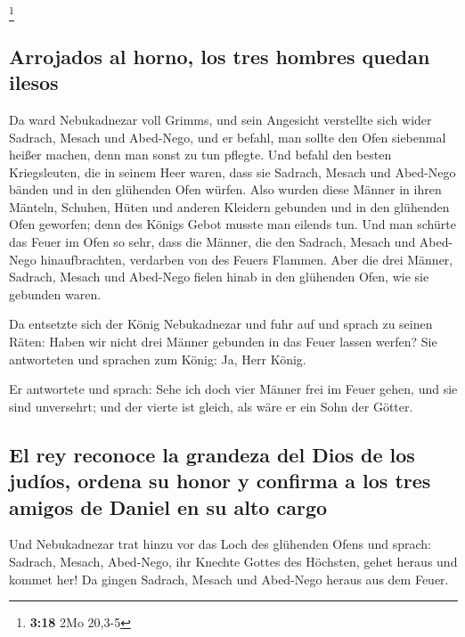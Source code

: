 \footnote{\textbf{3:18} 2Mo 20,3-5}

\hypertarget{arrojados-al-horno-los-tres-hombres-quedan-ilesos}{%
\subsection{Arrojados al horno, los tres hombres quedan
ilesos}\label{arrojados-al-horno-los-tres-hombres-quedan-ilesos}}

 Da ward Nebukadnezar voll Grimms, und sein Angesicht
verstellte sich wider Sadrach, Mesach und Abed-Nego, und er befahl, man
sollte den Ofen siebenmal heißer machen, denn man sonst zu tun pflegte.
 Und befahl den besten Kriegsleuten, die in seinem Heer
waren, dass sie Sadrach, Mesach und Abed-Nego bänden und in den
glühenden Ofen würfen.  Also wurden diese Männer in ihren
Mänteln, Schuhen, Hüten und anderen Kleidern gebunden und in den
glühenden Ofen geworfen;  denn des Königs Gebot musste
man eilends tun. Und man schürte das Feuer im Ofen so sehr, dass die
Männer, die den Sadrach, Mesach und Abed-Nego hinaufbrachten, verdarben
von des Feuers Flammen.  Aber die drei Männer, Sadrach,
Mesach und Abed-Nego fielen hinab in den glühenden Ofen, wie sie
gebunden waren.

 Da entsetzte sich der König Nebukadnezar und fuhr auf
und sprach zu seinen Räten: Haben wir nicht drei Männer gebunden in das
Feuer lassen werfen? Sie antworteten und sprachen zum König: Ja, Herr
König.

 Er antwortete und sprach: Sehe ich doch vier Männer frei
im Feuer gehen, und sie sind unversehrt; und der vierte ist gleich, als
wäre er ein Sohn der Götter.

\hypertarget{el-rey-reconoce-la-grandeza-del-dios-de-los-juduxedos-ordena-su-honor-y-confirma-a-los-tres-amigos-de-daniel-en-su-alto-cargo}{%
\subsection{El rey reconoce la grandeza del Dios de los judíos, ordena
su honor y confirma a los tres amigos de Daniel en su alto
cargo}\label{el-rey-reconoce-la-grandeza-del-dios-de-los-juduxedos-ordena-su-honor-y-confirma-a-los-tres-amigos-de-daniel-en-su-alto-cargo}}

 Und Nebukadnezar trat hinzu vor das Loch des glühenden
Ofens und sprach: Sadrach, Mesach, Abed-Nego, ihr Knechte Gottes des
Höchsten, gehet heraus und kommet her! Da gingen Sadrach, Mesach und
Abed-Nego heraus aus dem Feuer.

